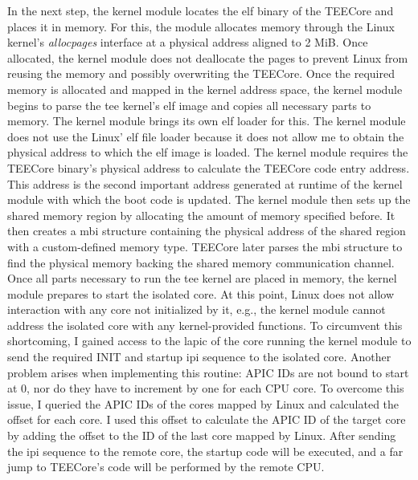 In the next step, the kernel module locates the \gls{elf} binary of the TEECore
and places it in memory. For this, the module allocates memory through the Linux
kernel's \textit{allocpages} interface at a physical address aligned to 2 MiB.
Once allocated, the kernel module does not deallocate the pages to prevent Linux
from reusing the memory and possibly overwriting the TEECore. Once the required
memory is allocated and mapped in the kernel address space, the kernel module
begins to parse the \gls{tee} kernel's \gls{elf} image and copies all necessary
parts to memory. The kernel module brings its own \gls{elf} loader for this. The
kernel module does not use the Linux' \gls{elf} file loader because it does not
allow me to obtain the physical address to which the \gls{elf} image is
loaded. The kernel module requires the TEECore binary's physical address to
calculate the TEECore code entry address. This address is the second important
address generated at runtime of the kernel module with which the boot code is
updated. The kernel module then sets up the shared memory region by allocating
the amount of memory specified before. It then creates a \gls{mbi} structure
containing the physical address of the shared region with a custom-defined
memory type. TEECore later parses the \gls{mbi} structure to find the physical
memory backing the shared memory communication channel.\\

Once all parts necessary to run the \gls{tee} kernel are placed in memory, the
kernel module prepares to start the isolated core. At this point, Linux does not
allow interaction with any core not initialized by it, e.g., the kernel module
cannot address the isolated core with any kernel-provided functions. To
circumvent this shortcoming, I gained access to the \gls{lapic} of the core
running the kernel module to send the required INIT and startup \gls{ipi}
sequence to the isolated core. Another problem arises when implementing this
routine: APIC IDs are not bound to start at 0, nor do they have to increment by
one for each CPU core. To overcome this issue, I queried the APIC IDs of the
cores mapped by Linux and calculated the offset for each core. I used this
offset to calculate the APIC ID of the target core by adding the offset to the
ID of the last core mapped by Linux. After sending the \gls{ipi} sequence to the
remote core, the startup code will be executed, and a far jump to TEECore's code
will be performed by the remote CPU.\\

